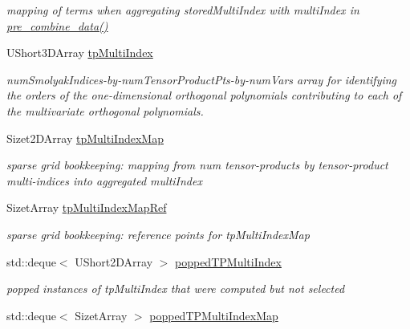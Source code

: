 \begin{DoxyCompactItemize}
\begin{DoxyCompactList}\small\item\em mapping of terms when aggregating stored\+Multi\+Index with multi\+Index in \hyperlink{classPecos_1_1SharedOrthogPolyApproxData_a9eb4d06b29a49d454be12741309d8a2b}{pre\+\_\+combine\+\_\+data()} \end{DoxyCompactList}\item 
U\+Short3\+D\+Array \hyperlink{classPecos_1_1SharedOrthogPolyApproxData_a0d72fce3d7a8d4b547ba6c49e9a121c4}{tp\+Multi\+Index}
\begin{DoxyCompactList}\small\item\em num\+Smolyak\+Indices-\/by-\/num\+Tensor\+Product\+Pts-\/by-\/num\+Vars array for identifying the orders of the one-\/dimensional orthogonal polynomials contributing to each of the multivariate orthogonal polynomials. \end{DoxyCompactList}\item 
Sizet2\+D\+Array \hyperlink{classPecos_1_1SharedOrthogPolyApproxData_a6c6c00366f3f3b52d766e0b520ec13b8}{tp\+Multi\+Index\+Map}\label{classPecos_1_1SharedOrthogPolyApproxData_a6c6c00366f3f3b52d766e0b520ec13b8}

\begin{DoxyCompactList}\small\item\em sparse grid bookkeeping\+: mapping from num tensor-\/products by tensor-\/product multi-\/indices into aggregated multi\+Index \end{DoxyCompactList}\item 
Sizet\+Array \hyperlink{classPecos_1_1SharedOrthogPolyApproxData_a3f1dac68dfd3c18f07d6b4455e8ab112}{tp\+Multi\+Index\+Map\+Ref}\label{classPecos_1_1SharedOrthogPolyApproxData_a3f1dac68dfd3c18f07d6b4455e8ab112}

\begin{DoxyCompactList}\small\item\em sparse grid bookkeeping\+: reference points for tp\+Multi\+Index\+Map \end{DoxyCompactList}\item 
std\+::deque$<$ U\+Short2\+D\+Array $>$ \hyperlink{classPecos_1_1SharedOrthogPolyApproxData_a5dfac1fa1c4482e70c72826daa33c16e}{popped\+T\+P\+Multi\+Index}\label{classPecos_1_1SharedOrthogPolyApproxData_a5dfac1fa1c4482e70c72826daa33c16e}

\begin{DoxyCompactList}\small\item\em popped instances of tp\+Multi\+Index that were computed but not selected \end{DoxyCompactList}\item 
std\+::deque$<$ Sizet\+Array $>$ \hyperlink{classPecos_1_1SharedOrthogPolyApproxData_af52316f46f8364c999cc08d821a48dcc}{popped\+T\+P\+Multi\+Index\+Map}\label{classPecos_1_1SharedOrthogPolyApproxData_af52316f46f8364c999cc08d821a48dcc}


\end{DoxyCompactItemize}
